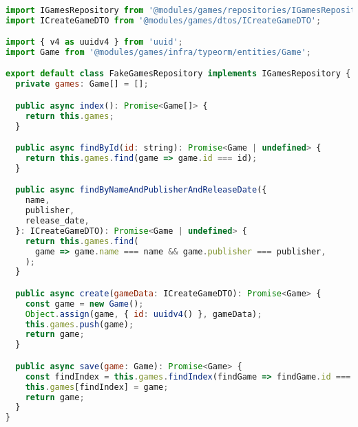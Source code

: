 \begin{lstlisting}[language=JavaScript, caption={FakeGamesRepository.ts},captionpos=b, label=alg:fakegamesrepository]

import IGamesRepository from '@modules/games/repositories/IGamesRepository';
import ICreateGameDTO from '@modules/games/dtos/ICreateGameDTO';

import { v4 as uuidv4 } from 'uuid';
import Game from '@modules/games/infra/typeorm/entities/Game';

export default class FakeGamesRepository implements IGamesRepository {
  private games: Game[] = [];

  public async index(): Promise<Game[]> {
    return this.games;
  }

  public async findById(id: string): Promise<Game | undefined> {
    return this.games.find(game => game.id === id);
  }

  public async findByNameAndPublisherAndReleaseDate({
    name,
    publisher,
    release_date,
  }: ICreateGameDTO): Promise<Game | undefined> {
    return this.games.find(
      game => game.name === name && game.publisher === publisher,
    );
  }

  public async create(gameData: ICreateGameDTO): Promise<Game> {
    const game = new Game();
    Object.assign(game, { id: uuidv4() }, gameData);
    this.games.push(game);
    return game;
  }

  public async save(game: Game): Promise<Game> {
    const findIndex = this.games.findIndex(findGame => findGame.id === game.id);
    this.games[findIndex] = game;
    return game;
  }
}
\end{lstlisting}